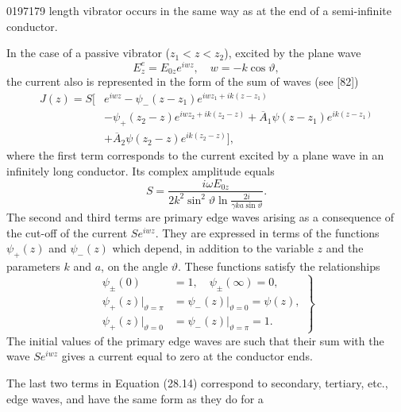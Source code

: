 \begin{scanpage}{0197}{179}
length vibrator occurs in the same way as at the end of a semi-infinite conductor.

In the case of a passive vibrator ($z_1<z<z_2$), excited by the plane wave
\[
E_z^e=E_{0z}e^{iwz},\quad w=-k\cos\vartheta,\tag{28.13}
\]
the current also is represented in the form of the sum of waves (see [82])
\[
\begin{aligned}J(z)=S[&e^{iwz}-\psi_-(z-z_1)e^{iwz_1+ik(z-z_1)}\\
&-\psi_+(z_2-z)e^{iwz_2+ik(z_2-z)}+\overline A_1\psi(z-z_1)e^{ik(z-z_1)}\\
&+\overline A_2\psi(z_2-z)e^{ik(z_2-z)}],
\end{aligned}\tag{28.14}
\]
where the first term corresponds to the current excited by a plane wave in an infinitely long conductor. Its complex amplitude equals
\[
S=\frac{i\omega E_{0z}}{2k^2\sin^2\vartheta\ln\frac{2i}{\gamma ka\sin\vartheta}}.\tag{28.15}
\]
The second and third terms are primary edge waves arising as a consequence of the cut-off of the current $Se^{iwz}$. They are expressed in terms of the functions $\psi_+(z)$ and $\psi_-(z)$ which depend, in addition to the variable $z$ and the parameters $k$ and $a$, on the angle $\vartheta$. These functions satisfy the relationships
\[
\left.\begin{aligned}\psi_\pm(0)&=1,\quad\psi_\pm(\infty)=0,\\
\psi_+(z)\big|_{\vartheta=\pi}&=\psi_-(z)\big|_{\vartheta=0}=\psi(z),\\
\psi_+(z)\big|_{\vartheta=0}&=\psi_-(z)\big|_{\vartheta=\pi}=1.
\end{aligned}\right\}\tag{28.16}
\]
The initial values of the primary edge waves are such that their sum with the wave $Se^{iwz}$ gives a current equal to zero at the conductor ends.

The last two terms in Equation (28.14) correspond to secondary, tertiary, etc., edge waves, and have the same form as they do for a
\end{scanpage}
